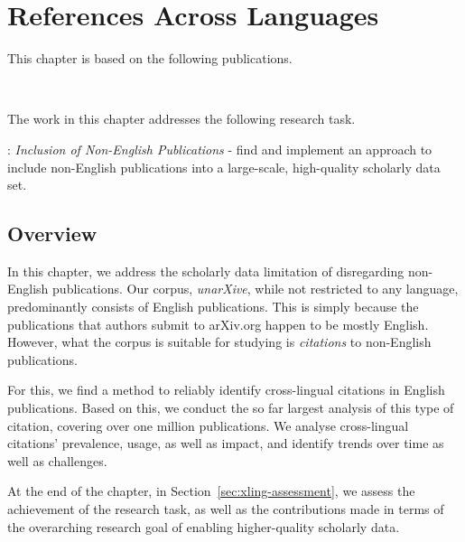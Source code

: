 \chapter{References Across Languages}
\label{chp:xling}

This chapter is based on the following publications.
\begin{infobox-pub}
\\
\end{infobox-pub}

\begin{infobox-pub}
\end{infobox-pub}

The work in this chapter addresses the following research task.

\begin{rtlist}
    \item[\rtmark{3}:] \textit{Inclusion of Non-English Publications} - find and implement an approach to include non-English publications into a large-scale, high-quality scholarly data set.
\end{rtlist}

\section{Overview}
In this chapter, we address the scholarly data limitation of disregarding non-English publications. Our corpus, \emph{unarXive}, while not restricted to any language, predominantly consists of English publications. This is simply because the publications that authors submit to arXiv.org happen to be mostly English. However, what the corpus is suitable for studying is \emph{citations} to non-English publications.

For this, we find a method to reliably identify cross-lingual citations in English publications. Based on this, we conduct the so far largest analysis of this type of citation, covering over one million publications. We analyse cross-lingual citations' prevalence, usage, as well as impact, and identify trends over time as well as challenges.

At the end of the chapter, in Section~\ref{sec:xling-assessment}, we assess the achievement of the research task, as well as the contributions made in terms of the overarching research goal of enabling higher-quality scholarly data.

